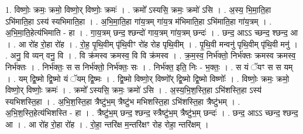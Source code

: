 \documentclass[17pt]{extarticle}
\begin{document}
1. विष्णोः॒ क्रमः॒ क्रमो॒ विष्णो॒र् विष्णोः॒ क्रमः॑ । . क्रमो᳚ ऽस्यसि॒ क्रमः॒ क्रमो॑ ऽसि । . अ॒स्य॒ भि॒मा॒ति॒हा ऽभि॑माति॒हा ऽस्य॑ स्यभिमाति॒हा । . अ॒भि॒मा॒ति॒हा गा॑य॒त्रम् गा॑य॒त्र म॑भिमाति॒हा ऽभि॑माति॒हा गा॑य॒त्रम् । . अ॒भि॒मा॒ति॒हेत्य॑भिमाति - हा । . गा॒य॒त्रम् छन्द॒ श्छन्दो॑ गाय॒त्रम् गा॑य॒त्रम् छन्दः॑ । . छन्द॒ आऽऽ च्छन्द॒ श्छन्द॒ आ । . आ रो॑ह रो॒हा रो॑ह । . रो॒ह॒ पृ॒थि॒वीम् पृ॑थि॒वीꣳ रो॑ह रोह पृथि॒वीम् । . पृ॒थि॒वी मन्वनु॑ पृथि॒वीम् पृ॑थि॒वी मनु॑ । . अनु॒ वि व्यन् वनु॒ वि । . वि क्र॑मस्व क्रमस्व॒ वि वि क्र॑मस्व । . क्र॒म॒स्व॒ निर्भ॑क्तो॒ निर्भ॑क्तः क्रमस्व क्रमस्व॒ निर्भ॑क्तः । . निर्भ॑क्तः॒ स स निर्भ॑क्तो॒ निर्भ॑क्तः॒ सः । . निर्भ॑क्त॒ इति॒ निः - भ॒क्तः॒ । . स यं ॅयꣳ स स यम् । . यम् द्वि॒ष्मो द्वि॒ष्मो यं ॅयम् द्वि॒ष्मः । . द्वि॒ष्मो विष्णो॒र् विष्णो᳚र् द्वि॒ष्मो द्वि॒ष्मो विष्णोः᳚ । . विष्णोः॒ क्रमः॒ क्रमो॒ विष्णो॒र् विष्णोः॒ क्रमः॑ । . क्रमो᳚ ऽस्यसि॒ क्रमः॒ क्रमो॑ ऽसि । . अ॒स्य॒भि॒श॒स्ति॒हा ऽभि॑शस्ति॒हा ऽस्य॑ स्यभिशस्ति॒हा । . अ॒भि॒श॒स्ति॒हा त्रैष्टु॑भ॒म् त्रैष्टु॑भ मभिशस्ति॒हा ऽभि॑शस्ति॒हा त्रैष्टु॑भम् । . अ॒भि॒श॒स्ति॒हेत्य॑भिशस्ति - हा । . त्रैष्टु॑भ॒म् छन्द॒ श्छन्द॒ स्त्रैष्टु॑भ॒म् त्रैष्टु॑भ॒म् छन्दः॑ । . छन्द॒ आऽऽ च्छन्द॒ श्छन्द॒ आ । . आ रो॑ह रो॒हा रो॑ह । . रो॒हा॒ न्तरि॑क्ष म॒न्तरि॑क्षꣳ रोह रोहा॒ न्तरि॑क्षम् । \newline
\end{document}
